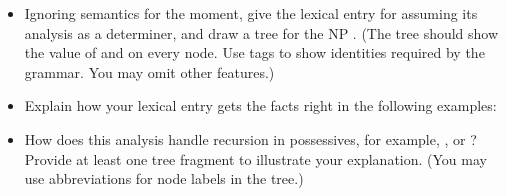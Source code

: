 \documentclass[a4paper,landscape,headrule,footrule]{foils}
\begin{document}
\begin{itemize}
\item[A.] Ignoring semantics for the moment, give the lexical entry for
 assuming its analysis as a  determiner, and draw 
a tree 
for the NP . 
(The tree should show the value of  and  on every
node.  Use tags to show identities required by the grammar.
You may omit other features.)

\item[B.] Explain how your lexical entry gets the facts right in the 
following examples:
\begin{exe}
\ex {}
\ex {}
\end{exe}

\item[C.] How does this analysis handle recursion in possessives, 
for example, , or ?  Provide at least one tree %
fragment
to illustrate your
explanation.
(You may use abbreviations for node labels in the tree.)
\end{itemize}




\end{document}
